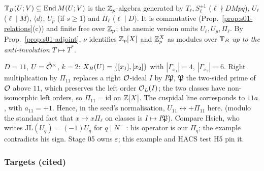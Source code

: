 \begin{definition}\label{def:s01-T}
$\mathbb{T}_B(U;V)\subseteq\operatorname{End}M(U;V)$ is the $\mathbb{Z}_p$-algebra generated by $T_\ell,S_\ell^{\pm1}$ ($\ell\nmid DMpq$), $U_\ell$ ($\ell\mid M$),
$\langle d\rangle$, $U_p$ (if $s\ge1$) and $\Pi_\ell$ ($\ell\mid D$). It is commutative (Prop.~\ref{prop:s01-relations}(c)) and finite
free over $\mathbb{Z}_p$; the anemic version omits $U_\ell,U_p,\Pi_\ell$. By Prop.~\ref{prop:s01-adjoint}, $\nu$ identifies $\mathbb{Z}_p[X]$ and
$\mathbb{Z}_p^X$ as modules over $\mathbb{T}_B$ \emph{up to the anti-involution} $T\mapsto T^*$.
\end{definition}

\begin{example}\label{ex:s01-Pi11}
$D=11$, $U=\hat{\mathcal{O}}^\times$, $k=2$: $X_B(U)=\{[x_1],[x_2]\}$ with $|\Gamma_{x_1}|=4$, $|\Gamma_{x_2}|=6$. Right multiplication by
$\Pi_{11}$ replaces a right $\mathcal{O}$-ideal $I$ by $I\mathfrak P$, $\mathfrak P$ the two-sided prime of $\mathcal{O}$ above $11$, which
preserves the left order $\mathcal{O}_L(I)$; the two classes have non-isomorphic left orders, so $\Pi_{11}=\mathrm{id}$ on $\mathbb{Z}[X]$. The cuspidal line
corresponds to $11a$, with $a_{11}=+1$. Hence, in the seed's normalisation, $U_{11}\leftrightarrow+\Pi_{11}$ here. \stproved{}
(modulo the standard fact that $x\mapsto x\Pi_\ell$ on classes is $I\mapsto I\mathfrak P$). Compare Hsieh, who writes
$\mathrm{JL}(U_q)=(-1)U_q$ for $q\mid N^-$ :
his operator is our $\Pi_q$; the example contradicts his sign.
Stage 05 owns $\varepsilon$; this example and HACS test H5 pin it.
\end{example}

\subsubsection{Targets (cited)}

